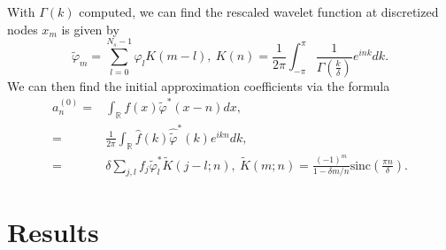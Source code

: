 \documentclass[a4paper,11pt]{article}
\begin{document}
With $\Gamma(k)$ computed, we can find the rescaled wavelet function at discretized nodes $x_{m}$ is given by 
\[
\tilde{\varphi}_{m} = \sum_{l=0}^{N_{s}-1}\varphi_{l}K(m-l), ~ K(n) = \frac{1}{2\pi}\int_{-\pi}^{\pi} \frac{1}{\Gamma\left(\frac{k}{\delta}\right)}e^{ink}dk.
\]
We can then find the initial approximation coefficients via the formula
\begin{align*}
a^{(0)}_{n} = & \int_{\mathbb{R}}f(x)\tilde{\varphi}^{\ast}(x-n)dx, \\
= & \frac{1}{2\pi}\int_{\mathbb{R}}\hat{f}(k) \hat{\tilde{\varphi}}^{\ast}(k)e^{ikn}dk,\\
= & \delta \sum_{j,l}f_{j}\tilde{\varphi}^{\ast}_{l}\tilde{K}(j-l;n), ~ \tilde{K}(m;n) = \frac{(-1)^{m}}{1-\delta m/n}\mbox{sinc}\left(\frac{\pi n}{\delta}\right).
\end{align*}
\section*{Results}
\end{document}
